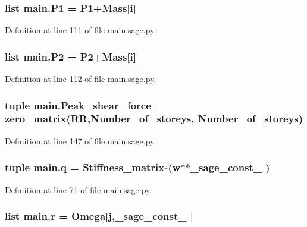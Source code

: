 \subsubsection[{P1}]{\setlength{\rightskip}{0pt plus 5cm}list main.\+P1 = P1+Mass\mbox{[}{\bf i}\mbox{]}}\label{namespacemain_add7e0394c94a2e2115aff785eb6995e3}


Definition at line 111 of file main.\+sage.\+py.

\hypertarget{namespacemain_a1b83b7a3849a8e1c84b9906c45625fec}{}
\subsubsection[{P2}]{\setlength{\rightskip}{0pt plus 5cm}list main.\+P2 = P2+Mass\mbox{[}{\bf i}\mbox{]}}\label{namespacemain_a1b83b7a3849a8e1c84b9906c45625fec}


Definition at line 112 of file main.\+sage.\+py.

\hypertarget{namespacemain_a9e135aea550f8ea419857f817a196d56}{}
\subsubsection[{Peak\+\_\+shear\+\_\+force}]{\setlength{\rightskip}{0pt plus 5cm}tuple main.\+Peak\+\_\+shear\+\_\+force = zero\+\_\+matrix(R\+R,Number\+\_\+of\+\_\+storeys, Number\+\_\+of\+\_\+storeys)}\label{namespacemain_a9e135aea550f8ea419857f817a196d56}


Definition at line 147 of file main.\+sage.\+py.

\hypertarget{namespacemain_a1787a37505189f764069a45071189112}{}
\subsubsection[{q}]{\setlength{\rightskip}{0pt plus 5cm}tuple main.\+q = {\bf Stiffness\+\_\+matrix}-\/({\bf w}$\ast$$\ast${\bf \+\_\+sage\+\_\+const\+\_} )}\label{namespacemain_a1787a37505189f764069a45071189112}


Definition at line 71 of file main.\+sage.\+py.

\hypertarget{namespacemain_a4760f4121f66000c5570f75176649cb8}{}
\subsubsection[{r}]{\setlength{\rightskip}{0pt plus 5cm}list main.\+r = {\bf Omega}\mbox{[}{\bf j},\+\_\+sage\+\_\+const\+\_ \mbox{]}}\label{namespacemain_a4760f4121f66000c5570f75176649cb8}


